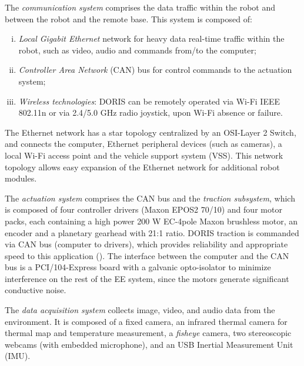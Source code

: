 \documentclass{ifacconf}
\begin{document}

The \emph{communication system} comprises the data traffic within the robot and between the robot and the remote base. This system is composed of:

\begin{enumerate}[i)]
  \item \emph{Local Gigabit Ethernet} network for heavy data real-time traffic within the robot, such as video, audio and commands from/to the computer;
  \item \emph{Controller Area Network} (CAN) bus for control commands to the actuation system;
  \item \emph{Wireless technologies}: DORIS can be remotely operated via Wi-Fi IEEE 802.11n or via 2.4/5.0 GHz radio joystick, upon Wi-Fi absence or failure.
\end{enumerate}

The Ethernet network has a star topology
centralized by an OSI-Layer 2 Switch, and connects the computer, Ethernet
peripheral devices (such as cameras), a local Wi-Fi access point and the
vehicle support system (VSS). This network topology allows easy expansion of
the Ethernet network for additional robot modules. 

The \emph{actuation system} comprises the CAN bus and the \emph{traction
subsystem}, which is composed of four controller drivers (Maxon EPOS2
70/10) and four motor packs, each containing a high power 200 W EC-4pole Maxon
brushless motor, an encoder and a planetary gearhead with 21:1 ratio. DORIS
traction is commanded via CAN bus (computer to drivers), which provides
reliability and appropriate speed to this application
(\cite{can}). The interface between the computer and the CAN bus is a
PCI/104-Express board with a galvanic opto-isolator to minimize interference on
the rest of the EE system, since the motors generate significant conductive
noise.


The \emph{data acquisition system} collects image, video, and audio data from
the environment. It is composed of a fixed camera, an infrared thermal camera
for thermal map and temperature measurement, a \emph{fisheye} camera, two
stereoscopic webcams (with embedded microphone), and an USB Inertial Measurement
Unit (IMU).
\end{document}
